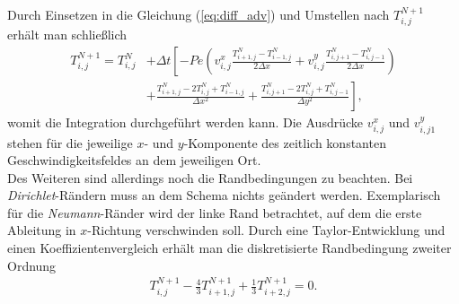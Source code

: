 \documentclass[12pt,a4paper,titlepage,headinclude,bibtotoc]{scrartcl}
\begin{document}
Durch Einsetzen in die Gleichung (\ref{eq:diff_adv}) und Umstellen nach $T_{i,j}^{N+1}$ erhält man schließlich %
\begin{align}
\label{eq:ftcs}
T_{i,j}^{N+1} = T_{i,j}^N &+ \Delta t \left[ -Pe \left( v^x_{i,j} \frac{T_{i+1,j}^N-T_{i-1,j}^N}{2\Delta x}+v^y_{i,j} \frac{T_{i,j+1}^N-T_{i,j-1}^N}{2\Delta x} \right) \right. \nonumber \\ 
 & \left.+ \frac{ T_{i+1,j}^N - 2 T_{i,j}^N +  T_{i-1,j}^N }{\Delta x^2} 
+ \frac{ T_{i,j+1}^N - 2  T_{i,j}^N + T_{i,j-1}^N}{\Delta y^2} \right],
\end{align}
womit die Integration durchgeführt werden kann. Die Ausdrücke $v^x_{i,j}$ und $v^y_{i,j1}$ stehen für die jeweilige $x$- und $y$-Komponente des zeitlich konstanten Geschwindigkeitsfeldes an dem jeweiligen Ort.\\
Des Weiteren sind allerdings noch die Randbedingungen zu beachten. Bei \textit{Dirichlet}-Rändern muss an dem Schema nichts geändert werden. Exemplarisch für die \textit{Neumann}-Ränder wird der linke Rand betrachtet, auf dem die erste Ableitung in $x$-Richtung verschwinden soll. Durch eine Taylor-Entwicklung und einen Koeffizientenvergleich erhält man die diskretisierte Randbedingung zweiter Ordnung
\begin{align*}
T_{i,j}^{N+1} - \frac{4}{3} T_{i+1,j}^{N+1} + \frac{1}{3} T_{i+2,j}^{N+1} = 0.
\end{align*}
\end{document}
